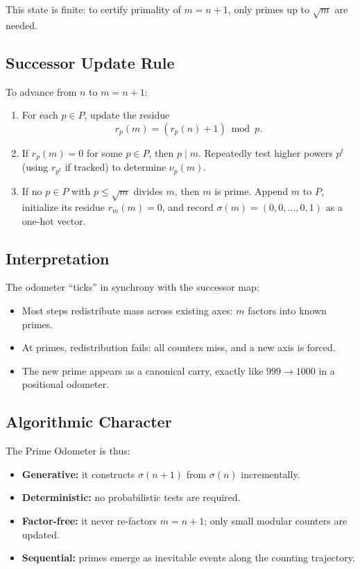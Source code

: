 \documentclass[12pt]{article}
\theoremstyle{definition}
\theoremstyle{remark}
\begin{document}
This state is finite: to certify primality of $m=n+1$, only primes up to $\sqrt{m}$ are needed.

\subsection{Successor Update Rule}

To advance from $n$ to $m=n+1$:

\begin{enumerate}
  \item For each $p \in P$, update the residue
  \[
  r_p(m) = (r_p(n)+1) \bmod p.
  \]

  \item If $r_p(m)=0$ for some $p \in P$, then $p \mid m$. Repeatedly test higher powers
        $p^t$ (using $r_{p^t}$ if tracked) to determine $\nu_p(m)$.

  \item If no $p \in P$ with $p \leq \sqrt{m}$ divides $m$, then $m$ is prime. Append $m$ to $P$,
        initialize its residue $r_m(m)=0$, and record $\sigma(m)=(0,0,\dots,0,1)$ as a one-hot vector.
\end{enumerate}

\subsection{Interpretation}

The odometer ``ticks'' in synchrony with the successor map:

\begin{itemize}
  \item Most steps redistribute mass across existing axes: $m$ factors into known primes.
  \item At primes, redistribution fails: all counters miss, and a new axis is forced.
  \item The new prime appears as a canonical carry, exactly like $999 \to 1000$ in a positional odometer.
\end{itemize}

\subsection{Algorithmic Character}

The Prime Odometer is thus:

\begin{itemize}
  \item \textbf{Generative:} it constructs $\sigma(n+1)$ from $\sigma(n)$ incrementally.
  \item \textbf{Deterministic:} no probabilistic tests are required.
  \item \textbf{Factor-free:} it never re-factors $m=n+1$; only small modular counters are updated.
  \item \textbf{Sequential:} primes emerge as inevitable events along the counting trajectory.
\end{itemize}
\end{document}
